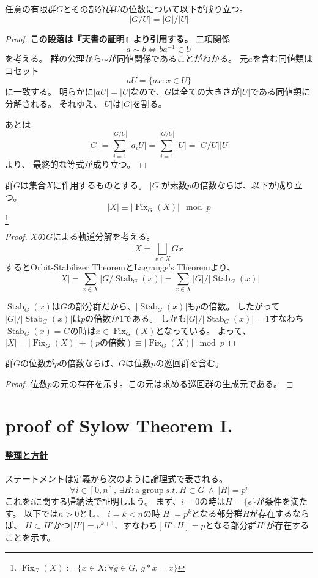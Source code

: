 \documentclass[a4paper]{jarticle}
\newcommand{\Stab}{\operatorname{Stab}}
\newcommand{\Fix}{\operatorname{Fix}}
\newcommand{\ulpar}[1]{\paragraph{\underline{#1}}}
\begin{document}
    \begin{Them}
        任意の有限群$G$とその部分群$U$の位数について以下が成り立つ。
        \[ |G/U|=|G|/|U| \]
    \end{Them}
    \begin{proof}
        \textbf{この段落は『天書の証明』より引用する。}
        二項関係\[ a \sim b \iff ba^{-1} \in U \]を考える。
        群の公理から$\sim$が同値関係であることがわかる。
        元$a$を含む同値類はコセット\[ aU=\{ ax : x \in U \} \]に一致する。
        明らかに$|aU|=|U|$なので、$G$は全ての大きさが$|U|$である同値類に分解される。
        それゆえ、$|U|$は$|G|$を割る。

        あとは
        \[ |G|=\sum_{i=1}^{|G/U|}{|a_i U|}=\sum_{i=1}^{|G/U|}{|U|}=|G/U||U| \]より、
        最終的な等式が成り立つ。
        
    \end{proof}

    \begin{Lemma}
        群$G$は集合$X$に作用するものとする。
        $|G|$が素数$p$の倍数ならば、以下が成り立つ。
        \[ |X| \equiv |\Fix_G(X)| \mod p\]
        \footnote{$\Fix_G(X):=\{x \in X : \forall g \in G,~ g \ast x=x \}$}
    \end{Lemma}
    \begin{proof}
        $X$の$G$による軌道分解を考える。
        \[ X= \bigsqcup_{x \in X}{Gx} \]
        するとOrbit-Stabilizer TheoremとLagrange's Theoremより、
        \[ |X| = \sum_{x \in X}{|G/ \Stab_G(x)|} = \sum_{x \in X}{|G|/|\Stab_G(x)|}\]

        $\Stab_G(x)$は$G$の部分群だから、$|\Stab_G(x)|$も$p$の倍数。
        したがって$|G|/|\Stab_G(x)|$は$p$の倍数か1である。
        しかも$|G|/|\Stab_G(x)|=1$すなわち$\Stab_G(x)=G$の時は$x \in \Fix_G(X)$となっている。
        よって、$|X|=|\Fix_G(X)|+(p\mbox{の倍数}) \equiv |\Fix_G(X)| \mod p$
        
    \end{proof}

    \begin{Them}
        群$G$の位数が$p$の倍数ならば、$G$は位数$p$の巡回群を含む。
    \end{Them}
    \begin{proof}
        位数$p$の元の存在を示す。この元は求める巡回群の生成元である。
    \end{proof}

\section{proof of Sylow Theorem I.}
    \ulpar{整理と方針}
    ステートメントは定義から次のように論理式で表される。
    \[ \forall i \in [0, n],~ \exists H : \mbox{a group} ~s.t.~ H \subset G ~\wedge~ |H|=p^i \]
    これを$i$に関する帰納法で証明しよう。
    まず、$i=0$の時は$H=\{e\}$が条件を満たす。
    以下では$n > 0$とし、
    $i=k<n$の時$|H|=p^k$となる部分群$H$が存在するならば、
    $H \subset H'$かつ$|H'|=p^{k+1}$、すなわち$[H':H]=p$となる部分群$H'$が存在することを示す。
\end{document}
